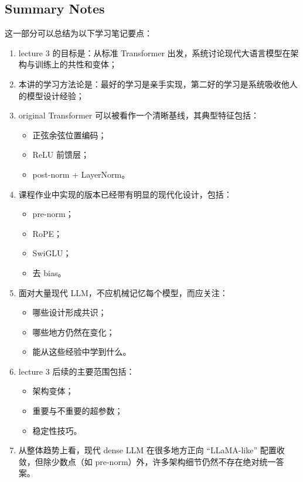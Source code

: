 \documentclass[a4paper,UTF8]{article}
\numberwithin{equation}{section}
\begin{document}
\subsection{Summary Notes}

这一部分可以总结为以下学习笔记要点：

\begin{enumerate}
    \item lecture 3 的目标是：从标准 Transformer 出发，系统讨论现代大语言模型在架构与训练上的共性和变体；
    \item 本讲的学习方法论是：最好的学习是亲手实现，第二好的学习是系统吸收他人的模型设计经验；
    \item original Transformer 可以被看作一个清晰基线，其典型特征包括：
    \begin{itemize}
        \item 正弦余弦位置编码；
        \item ReLU 前馈层；
        \item post-norm + LayerNorm。
    \end{itemize}
    \item 课程作业中实现的版本已经带有明显的现代化设计，包括：
    \begin{itemize}
        \item pre-norm；
        \item RoPE；
        \item SwiGLU；
        \item 去 bias。
    \end{itemize}
    \item 面对大量现代 LLM，不应机械记忆每个模型，而应关注：
    \begin{itemize}
        \item 哪些设计形成共识；
        \item 哪些地方仍然在变化；
        \item 能从这些经验中学到什么。
    \end{itemize}
    \item lecture 3 后续的主要范围包括：
    \begin{itemize}
        \item 架构变体；
        \item 重要与不重要的超参数；
        \item 稳定性技巧。
    \end{itemize}
    \item 从整体趋势上看，现代 dense LLM 在很多地方正向 ``LLaMA-like'' 配置收敛，但除少数点（如 pre-norm）外，许多架构细节仍然不存在绝对统一答案。
\end{enumerate}
\end{document}
